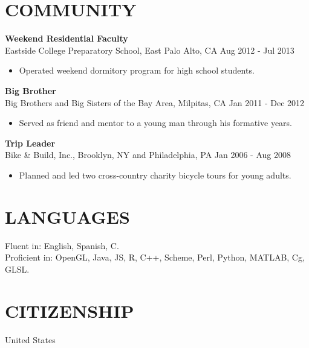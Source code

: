\documentclass[line,margin]{res}
\begin{document}
\begin{resume}
\section{COMMUNITY}
\textbf{Weekend Residential Faculty} \\
Eastside College Preparatory School, East Palo Alto, CA \hfill Aug 2012 - Jul 2013
\begin{itemize}  \itemsep -2pt %
\item Operated weekend dormitory program for high school students.
\end{itemize}

\textbf{Big Brother} \\
Big Brothers and Big Sisters of the Bay Area, Milpitas, CA \hfill Jan 2011 - Dec 2012
\begin{itemize}  \itemsep -2pt %
\item Served as friend and mentor to a young man through his formative years.
\end{itemize}

\textbf{Trip Leader} \\
Bike \& Build, Inc., Brooklyn, NY and Philadelphia, PA \hfill Jan 2006 - Aug 2008
\begin{itemize}  \itemsep -2pt %
\item Planned and led two cross-country charity bicycle tours for young adults.
\end{itemize}




\section{LANGUAGES}
Fluent in: English, Spanish, C.\\
Proficient in: OpenGL, Java, JS, R, C++, Scheme, Perl, Python, MATLAB, Cg, GLSL.

\section{CITIZENSHIP}
United States

\end{resume}
\end{document}
